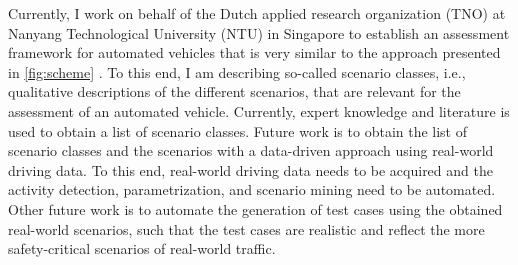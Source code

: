 \documentclass[10pt,final,a4paper,oneside,onecolumn]{article}
\begin{document}
Currently, I work on behalf of the Dutch applied research organization (TNO) at Nanyang Technological University (NTU) in Singapore to establish an assessment framework for automated vehicles that is very similar to the approach presented in \cref{fig:scheme} \cite{ploeg2018cetran}. To this end, I am describing so-called scenario classes, i.e., qualitative descriptions of the different scenarios, that are relevant for the assessment of an automated vehicle. Currently, expert knowledge and literature is used to obtain a list of scenario classes. Future work is to obtain the list of scenario classes and the scenarios with a data-driven approach using real-world driving data. To this end, real-world driving data needs to be acquired and the activity detection, parametrization, and scenario mining need to be automated. Other future work is to automate the generation of test cases using the obtained real-world scenarios, such that the test cases are realistic and reflect the more safety-critical scenarios of real-world traffic.
\end{document}
